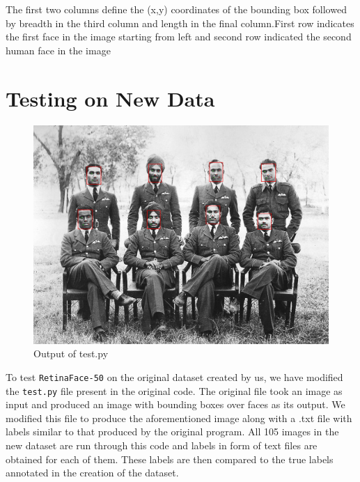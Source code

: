 \documentclass{article}
\begin{document}
The first two columns define the (x,y) coordinates of the bounding box followed by breadth in the third column and length in the final column.First row indicates the first face in the image starting from left and second row indicated the second human face in the image
\section{Testing on New Data}
\begin{figure}[H]
	\includegraphics[width=\linewidth]{66.jpg}
	\caption{Output of test.py}
\end{figure}

To test \texttt{RetinaFace-50} on the original dataset created by us, we have modified the \texttt{test.py} file present in the original code. The original file took an image as input and produced an image with bounding boxes over faces as its output. We modified this file to produce the aforementioned image along with a .txt file with labels similar to that produced by the original program. All 105 images in the new dataset are run through this code and labels in form of text files are obtained for each of them. These labels are then compared to the true labels annotated in the creation of the dataset. 
\end{document}

